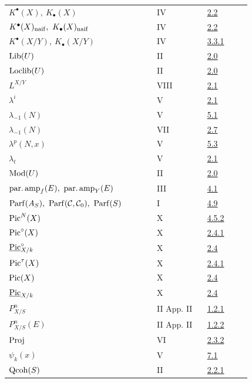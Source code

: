 \begin{longtable}{@{}>{\raggedright\arraybackslash}p{0.50\linewidth}>{\raggedright\arraybackslash}p{0.17\linewidth}>{\raggedright\arraybackslash}p{0.15\linewidth}@{}}
\(K^\bullet(X),\ K_\bullet(X)\) & IV & \hyperlink{sga6.e04.def.2-2}{2.2}\\
\(K^\bullet(X)_{\naif},\ K_\bullet(X)_{\naif}\) & IV & \hyperlink{sga6.e04.def.2-2}{2.2}\\
\(K^\bullet(X/Y),\ K_\bullet(X/Y)\) & IV & \hyperlink{sga6.e04.para.3-3-1}{3.3.1}\\
\(\operatorname{Lib}(U)\) & II & \hyperlink{sga6.e02.sec.2.0}{2.0}\\
\(\operatorname{Loclib}(U)\) & II & \hyperlink{sga6.e02.sec.2.0}{2.0}\\
\(L^{X/Y}\) & VIII & \hyperlink{sga6.e08.para.2-1}{2.1}\\
\(\lambda^i\) & V & \hyperlink{sga6.e05.def.2-1}{2.1}\\
\(\lambda_{-1}(N)\) & V & \hyperlink{sga6.e05.para.5-1}{5.1}\\
\(\lambda_{-1}(N)\) & VII & \hyperlink{sga6.e07.para.2-6}{2.7}\\
\(\lambda^p(N,x)\) & V & \hyperlink{sga6.e05.def.5-3}{5.3}\\
\(\lambda_t\) & V & \hyperlink{sga6.e05.def.2-1}{2.1}\\
\(\operatorname{Mod}(U)\) & II & \hyperlink{sga6.e02.sec.2.0}{2.0}\\
\(\parfamp_f(E),\ \parfamp_Y(E)\) & III & \hyperlink{sga6.e03.def.4-1}{4.1}\\
\(\Parf(A_S),\ \Parf(\mathcal C,\mathcal C_0),\ \Parf(S)\) & I & \hyperlink{sga6.e01.notation.4-9}{4.9}\\
\(\operatorname{Pic}^N(X)\) & X & \hyperlink{sga6.e10.prop.4-5-2}{4.5.2}\\
\(\operatorname{Pic}^\circ(X)\) & X & \hyperlink{sga6.e10.def.2-4-1}{2.4.1}\\
\(\underline{\operatorname{Pic}}^{\circ}_{X/k}\) & X & \hyperlink{sga6.e10.sec.2.4}{2.4}\\
\(\operatorname{Pic}^\tau(X)\) & X & \hyperlink{sga6.e10.def.2-4-1}{2.4.1}\\
\(\operatorname{Pic}(X)\) & X & \hyperlink{sga6.e10.sec.2.4}{2.4}\\
\(\underline{\operatorname{Pic}}_{X/k}\) & X & \hyperlink{sga6.e10.sec.2.4}{2.4}\\
\(P^n_{X/S}\) & II App. II & \hyperlink{sga6.e02.para.1-2-1}{1.2.1}\\
\(P^n_{X/S}(E)\) & II App. II & \hyperlink{sga6.e02.para.1-2-2}{1.2.2}\\
\(\operatorname{Proj}\) & VI & \hyperlink{sga6.e06.para.2-3-2}{2.3.2}\\
\(\psi_k(x)\) & V & \hyperlink{sga6.e05.para.7-1}{7.1}\\
\(\operatorname{Qcoh}(S)\) & II & \hyperlink{sga6.e02.notation.2-2-1}{2.2.1}\\

\end{longtable}
